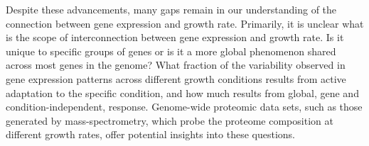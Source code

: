 Despite these advancements, many gaps remain in our understanding of the connection between gene expression and growth rate.
Primarily, it is unclear what is the scope of interconnection between gene expression and growth rate.
Is it unique to specific groups of genes or is it a more global phenomenon shared across most genes in the genome?
What fraction of the variability observed in gene expression patterns across different growth conditions results from active adaptation to the specific condition, and how much results from global, gene and condition-independent, response.
Genome-wide proteomic data sets, such as those generated by mass-spectrometry, which probe the proteome composition at different growth rates, offer potential insights into these questions.